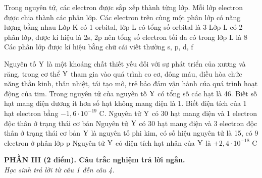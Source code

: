 \documentclass[11pt,a4paper]{article}
\begin{document}
\begin{ex}
Trong nguyên tử, các electron được sắp xếp thành từng lớp. Mỗi lớp electron được chia thành các phân lớp.
\choiceTF
{\True Các electron trên cùng một phân lớp có năng lượng bằng nhau}
{Lớp K có 1 orbital, lớp L có tổng số orbital là 3}
{\True Lớp L có 2 phân lớp, được kí hiệu là 2s, 2p nên tổng số electron tối đa có trong lớp L là 8}
{\True Các phân lớp được kí hiệu bằng chữ cái viết thường s, p, d, f}

\end{ex}
\begin{ex}
Nguyên tố $\ce{Y}$ là một khoáng chất thiết yếu đối với sự phát triển của xương và răng, trong cơ thể $\ce{Y}$ tham gia vào quá trình co cơ, đông máu, điều hòa chức năng thần kinh, thân nhiệt, tái tạo mô, trẻ bảo đảm vận hành của quá trình hoạt động của tim. Trong nguyên tử của nguyên tố $\ce{Y}$ có tổng số các hạt là 46. Biết số hạt mang điện dương ít hơn số hạt không mang điện là 1. Biết điện tích của 1 hạt electron bằng $-1,6 \cdot 10^{-19}\text{ C}$.
\choiceTF
{Nguyên tử $\ce{Y}$ có 30 hạt mang điện và 1 electron độc thân ở trạng thái cơ bản}
{\True Nguyên tử $\ce{Y}$ có 30 hạt mang điện và 3 electron độc thân ở trạng thái cơ bản}
{\True $\ce{Y}$ là nguyên tố phi kim, có số hiệu nguyên tử là 15, có 9 electron ở phân lớp p}
{\True Nguyên tử $\ce{Y}$ có điện tích hạt nhân của $\ce{Y}$ là $+2,4 \cdot 10^{-18}\text{ C}$}

\end{ex}
\vspace{4pt}
\noindent
{\color{mainGreen}\textbf{\Large PHẦN III (2 điểm). Câu trắc nghiệm trả lời ngắn.}}\\
\textit{\small Học sinh trả lời từ câu 1 đến câu 4.}
\vspace{2pt}
\end{document}
